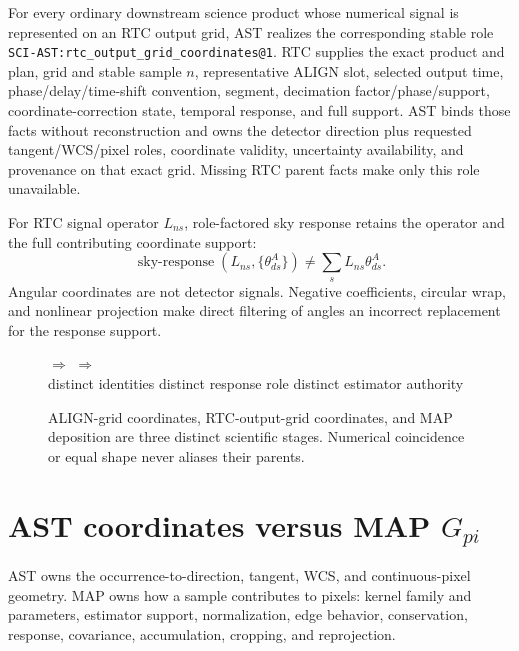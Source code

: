 \documentclass[10pt]{article}
\begin{document}
For every ordinary downstream science product whose numerical signal is
represented on an RTC output grid, AST realizes the corresponding stable role
\nolinkurl{SCI-AST:rtc_output_grid_coordinates@1}. RTC supplies the exact
product and plan, grid and stable sample \(n\), representative ALIGN slot,
selected output time, phase/delay/time-shift convention, segment, decimation
factor/phase/support, coordinate-correction state, temporal response, and full
support. AST binds those facts without reconstruction and owns the detector
direction plus requested tangent/WCS/pixel roles, coordinate validity,
uncertainty availability, and provenance on that exact grid. Missing RTC
parent facts make only this role unavailable.

For RTC signal operator $L_{ns}$, role-factored sky response retains the
operator and the full contributing coordinate support:
\begin{equation*}
 \operatorname{sky\mbox{-}response}
 (L_{ns},\{\theta^A_{ds}\})\ne
 \sum_s L_{ns}\theta^A_{ds}.
\end{equation*}
Angular coordinates are not detector signals. Negative coefficients,
circular wrap, and nonlinear projection make direct filtering of angles an
incorrect replacement for the response support.

\begin{figure}[!ht]
\centering
{}\quad$\Longrightarrow$\quad
{}
\quad$\Longrightarrow$\quad
{}\\[10pt]
\small distinct identities \hfill distinct response role \hfill distinct estimator authority
\caption{ALIGN-grid coordinates, RTC-output-grid coordinates, and MAP
deposition are three distinct scientific stages. Numerical coincidence or
equal shape never aliases their parents.}
\label{fig:grid-roles}
\end{figure}

\newpage
\section{AST coordinates versus MAP $G_{pi}$}
AST owns the occurrence-to-direction, tangent, WCS, and continuous-pixel
geometry. MAP owns how a sample contributes to pixels: kernel family and
parameters, estimator support, normalization, edge behavior, conservation,
response, covariance, accumulation, cropping, and reprojection.
\end{document}
